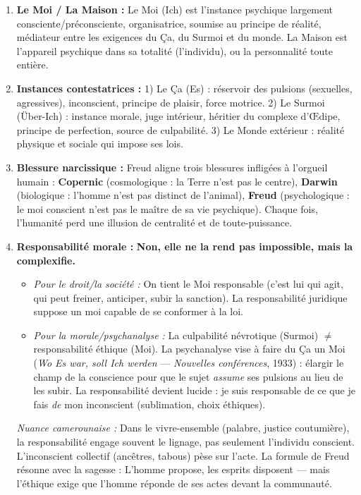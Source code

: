 \documentclass[11pt]{article}
\newcommand{\cle}[1]{{\popxbold\color{popdark}#1}}
\begin{document}
\begin{corrige}
\begin{enumerate}
\item \textbf{Le Moi / La Maison :} Le \cle{Moi} (Ich) est l'instance psychique largement consciente/préconsciente, organisatrice, soumise au principe de réalité, médiateur entre les exigences du Ça, du Surmoi et du monde. La \cle{Maison} est l'\cle{appareil psychique} dans sa totalité (l'individu), ou la personnalité toute entière.
\item \textbf{Instances contestatrices :} 1) Le \cle{Ça} (Es) : réservoir des pulsions (sexuelles, agressives), inconscient, principe de plaisir, force motrice. 2) Le \cle{Surmoi} (Über-Ich) : instance morale, juge intérieur, héritier du complexe d'Œdipe, principe de perfection, source de culpabilité. 3) Le \cle{Monde extérieur} : réalité physique et sociale qui impose ses lois.
\item \textbf{Blessure narcissique :} Freud aligne trois \guillemotleft blessures \guillemotright infligées à l'orgueil humain : \textbf{Copernic} (cosmologique : la Terre n'est pas le centre), \textbf{Darwin} (biologique : l'homme n'est pas distinct de l'animal), \textbf{Freud} (psychologique : le moi conscient n'est pas le maître de sa vie psychique). Chaque fois, l'humanité perd une illusion de centralité et de toute-puissance.
\item \textbf{Responsabilité morale :} \textbf{Non, elle ne la rend pas impossible, mais la complexifie.}
\begin{itemize}
\item \textit{Pour le droit/la société :} On tient le \cle{Moi} responsable (c'est lui qui agit, qui peut freiner, anticiper, subir la sanction). La responsabilité juridique suppose un moi capable de se conformer à la loi.
\item \textit{Pour la morale/psychanalyse :} La culpabilité névrotique (Surmoi) $\neq$ responsabilité éthique (Moi). La psychanalyse vise à \guillemotleft faire du Ça un Moi \guillemotright (\emph{Wo Es war, soll Ich werden} — \emph{Nouvelles conférences}, 1933) : élargir le champ de la conscience pour que le sujet \emph{assume} ses pulsions au lieu de les subir. La responsabilité devient \cle{lucide} : je suis responsable de ce que je fais \emph{de} mon inconscient (sublimation, choix éthiques).
\end{itemize}
\textit{Nuance camerounaise :} Dans le \cle{vivre-ensemble} (palabre, justice coutumière), la responsabilité engage souvent le lignage, pas seulement l'individu conscient. L'inconscient collectif (ancêtres, tabous) pèse sur l'acte. La formule de Freud résonne avec la sagesse : \guillemotleft L'homme propose, les esprits disposent \guillemotright — mais l'éthique exige que l'homme réponde de ses actes devant la communauté.
\end{enumerate}
\end{corrige}
\end{document}

